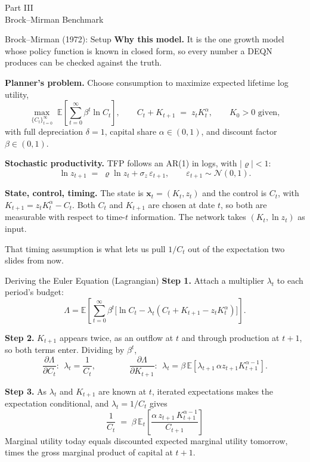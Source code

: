 \documentclass[aspectratio=169,11pt]{beamer}
\newcommand{\emphc}[1]{\textcolor{harvardcrimson}{#1}}
\newcommand{\x}{\bm{x}}
\newcommand{\E}[1]{\mathbb{E}\!\left[#1\right]}
\newcommand{\Et}[1]{\mathbb{E}_t\!\left[#1\right]}
\newcommand{\state}{\bm{x}}          %
\newcommand{\Lag}{\Lambda}           %
\begin{document}
\begin{frame}{}
\begin{center}
{\Huge \textcolor{uzhblue}{Part III}}\\[0.8em]
{\LARGE Brock--Mirman Benchmark}
\end{center}
\end{frame}

\begin{frame}{Brock--Mirman (1972): Setup}
\textbf{Why this model.} It is the one growth model whose policy function is known in closed form, so every number a DEQN produces can be checked against the truth.

\vspace{0.3em}
\textbf{Planner's problem.} Choose consumption to maximize expected lifetime log utility,
\[
\max_{\{C_t\}_{t=0}^{\infty}} \; \E{\sum_{t=0}^{\infty} \beta^t \ln C_t}, \qquad
C_t + K_{t+1} \;=\; z_t K_t^{\alpha}, \qquad K_0 > 0 \text{ given},
\]
with full depreciation $\delta = 1$, capital share $\alpha \in (0,1)$, and discount factor $\beta \in (0,1)$.

\vspace{0.2em}
\textbf{Stochastic productivity.} TFP follows an AR(1) in logs, with $|\varrho| < 1$:
\[
\ln z_{t+1} \;=\; \varrho \ln z_t + \sigma_z\, \varepsilon_{t+1}, \qquad \varepsilon_{t+1} \sim \mathcal{N}(0,1).
\]

\vspace{0.2em}
\textbf{State, control, timing.} The state is $\state_t = (K_t, z_t)$ and the control is $C_t$, with $K_{t+1} = z_t K_t^\alpha - C_t$. Both $C_t$ and $K_{t+1}$ are \emphc{chosen at date $t$}, so both are measurable with respect to time-$t$ information. The network takes $(K_t, \ln z_t)$ as input.

\vspace{0.3em}
{\footnotesize That timing assumption is what lets us pull $1/C_t$ out of the expectation two slides from now.}
\end{frame}

\begin{frame}{Deriving the Euler Equation (Lagrangian)}
\textbf{Step 1.} Attach a multiplier $\lambda_t$ to each period's budget:
\[
\Lag = \E{\textstyle\sum_{t=0}^{\infty} \beta^t \bigl[\ln C_t - \lambda_t( C_t + K_{t+1} - z_t K_t^{\alpha})\bigr]}.
\]

\textbf{Step 2.} $K_{t+1}$ appears \emphc{twice}, as an outflow at $t$ and through production at $t{+}1$, so both terms enter. Dividing by $\beta^t$,
\[
\frac{\partial\Lag}{\partial C_t}: \ \ \lambda_t = \frac{1}{C_t},
\qquad\qquad
\frac{\partial\Lag}{\partial K_{t+1}}: \ \ \lambda_t = \beta\,\E{\lambda_{t+1}\,\alpha z_{t+1} K_{t+1}^{\alpha-1}} .
\]

\textbf{Step 3.} As $\lambda_t$ and $K_{t+1}$ are known at $t$, iterated expectations makes the expectation conditional, and $\lambda_t = 1/C_t$ gives
\[
\boxed{\;\; \frac{1}{C_t} \;=\; \beta\, \Et{\frac{\alpha\, z_{t+1}\, K_{t+1}^{\alpha-1}}{C_{t+1}}} \;\;}
\]
{\footnotesize Marginal utility today equals discounted expected marginal utility tomorrow, times the gross marginal product of capital at $t{+}1$.}
\end{frame}
\end{document}
